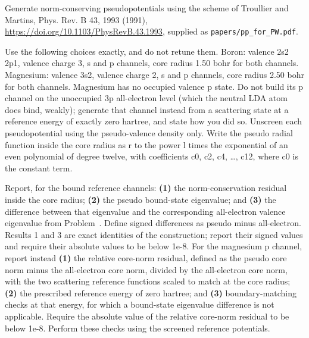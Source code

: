 
Generate norm-conserving pseudopotentials using the scheme of Troullier and Martins, Phys. Rev. B 43, 1993
(1991), \url{https://doi.org/10.1103/PhysRevB.43.1993}, supplied as \texttt{papers/pp\_for\_PW.pdf}.

Use the following choices exactly, and do not retune them. Boron: valence 2s2 2p1, valence charge 3, s and p
channels, core radius 1.50 bohr for both channels. Magnesium: valence 3s2, valence charge 2, s and p channels,
core radius 2.50 bohr for both channels. Magnesium has no occupied valence p state. Do not build its p channel on the unoccupied 3p all-electron
level (which the neutral LDA atom does bind, weakly); generate that channel instead from
a scattering state at a reference energy of exactly zero hartree, and state how you did so. Unscreen each
pseudopotential using the pseudo-valence density only. Write the pseudo radial function inside
the core radius as r to the power l times the exponential of an even polynomial of degree twelve, with
coefficients c0, c2, c4, \ldots, c12, where c0 is the constant term.

Report, for the bound reference channels: \textbf{(1)} the norm-conservation residual inside the core radius;
\textbf{(2)} the pseudo bound-state eigenvalue; and \textbf{(3)} the difference between that eigenvalue and the
corresponding all-electron valence eigenvalue from Problem~. Define signed differences as pseudo minus
all-electron. Results 1 and 3 are exact identities of the construction; report their signed values and require
their absolute values to be below 1e-8.
For the magnesium p channel, report instead \textbf{(1)} the relative core-norm residual, defined as the
pseudo core norm minus the all-electron core norm, divided by the all-electron core norm, with the two
scattering reference functions scaled to match at the core radius; \textbf{(2)} the prescribed reference energy
of zero hartree; and \textbf{(3)} boundary-matching checks at that energy, for which a bound-state eigenvalue
difference is not applicable. Require the absolute value of the relative core-norm residual to be below 1e-8.
Perform these checks using the screened reference potentials.

